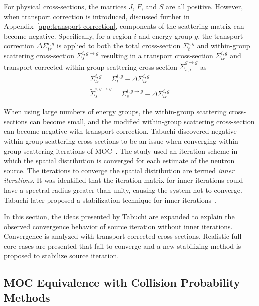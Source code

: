 For physical cross-sections, the matrices $J$, $F$, and $S$ are all positive. However, when transport correction is introduced, discussed further in Appendix~\ref{app:transport-correction}, components of the scattering matrix can become negative. Specifically, for a region $i$ and energy group $g$, the transport correction $\Delta \Sigma_{\textit{tr}}^{i, g}$ is applied to both the total cross-section $\Sigma_{t}^{i, g}$ and within-group scattering cross-section $\Sigma_{s}^{i, g \rightarrow g}$ resulting in a transport cross-section $\Sigma_{\textit{tr}}^{i, g}$ and transport-corrected within-group scattering cross-section $\tilde{\Sigma}_{s, i}^{g \rightarrow g}$ as
\begin{equation}
\begin{split}
\Sigma_{\textit{tr}}^{i,g} = \Sigma_{t}^{i,g} -  \Delta \Sigma_{\textit{tr}}^{i, g} \\
\tilde{\Sigma}_{s}^{i,g \rightarrow g} = \Sigma_{s}^{i, g \rightarrow g} -  \Delta \Sigma_{\textit{tr}}^{i, g}
\end{split}
\label{eq:total-xs}
\end{equation}

When using large numbers of energy groups, the within-group scattering cross-sections can become small, and the modified within-group scattering cross-section can become negative with transport correction. Tabuchi discovered negative within-group scattering cross-sections to be an issue when converging within-group scattering iterations of \ac{MOC}~\cite{ty-problem}. The study used an iteration scheme in which the spatial distribution is converged for each estimate of the neutron source. The iterations to converge the spatial distribution are termed \textit{inner iterations}. It was identified that the iteration matrix for inner iterations could have a spectral radius greater than unity, causing the system not to converge. Tabuchi later proposed a stabilization technique for inner iterations~\cite{ty-solution}.

In this section, the ideas presented by Tabuchi are expanded to explain the observed convergence behavior of source iteration without inner iterations. Convergence is analyzed with transport-corrected cross-sections. Realistic full core cases are presented that fail to converge and a new stabilizing method is proposed to stabilize source iteration.

\subsection{MOC Equivalence with Collision Probability Methods}
\label{sec:equiv-cpm}

